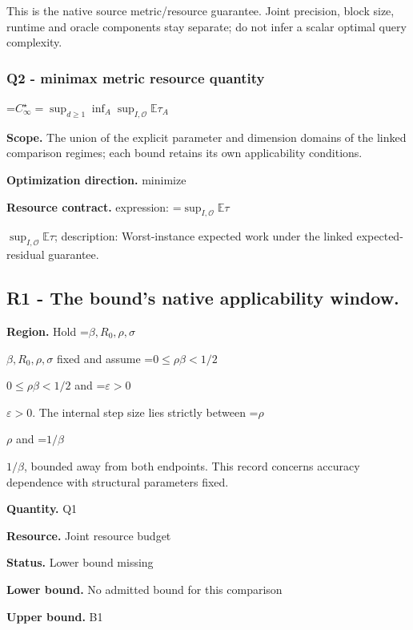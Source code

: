 \documentclass[10pt,a4paper]{article}
\newcommand{\AtlasMath}[1]{\par\begingroup\centering\setbox0=\hbox{$\displaystyle #1$}\ifdim\wd0>1.4\linewidth\typeout{ATLAS WIDE FORMULA: \the\wd0}\fi\ifdim\wd0>\linewidth\resizebox{\linewidth}{!}{\box0}\else\box0\fi\par\endgroup}
\newcommand{\AtlasInlineMath}[1]{\begingroup\setbox0=\hbox{$#1$}\ifdim\wd0>.4\linewidth\endgroup\AtlasMath{#1}\else\endgroup$#1$\fi}
\begin{document}
This is the native source metric/resource guarantee. Joint precision, block size, runtime and oracle components stay separate; do not infer a scalar optimal query complexity.



\subsubsection{Q2 - minimax metric resource quantity}


\AtlasMath{C^\star_\infty=\sup_{d\ge1}\inf_A\sup_{I,\mathcal O}\mathbb E\tau_A}


\textbf{Scope.} The union of the explicit parameter and dimension domains of the linked comparison regimes; each bound retains its own applicability conditions.



\textbf{Optimization direction.} minimize



\textbf{Resource contract.} expression: \AtlasInlineMath{\sup_{I,\mathcal O}\mathbb E\tau}; description: Worst-instance expected work under the linked expected-residual guarantee.



\subsection{R1 - The bound’s native applicability window.}


\textbf{Region.} Hold \AtlasInlineMath{\beta,R_0,\rho,\sigma} fixed and assume \AtlasInlineMath{0\le\rho\beta<1/2} and \AtlasInlineMath{\varepsilon>0}. The internal step size lies strictly between \AtlasInlineMath{\rho} and \AtlasInlineMath{1/\beta}, bounded away from both endpoints. This record concerns accuracy dependence with structural parameters fixed.



\textbf{Quantity.} Q1



\textbf{Resource.} Joint resource budget



\textbf{Status.} Lower bound missing



\textbf{Lower bound.} No admitted bound for this comparison



\textbf{Upper bound.} B1
\end{document}
